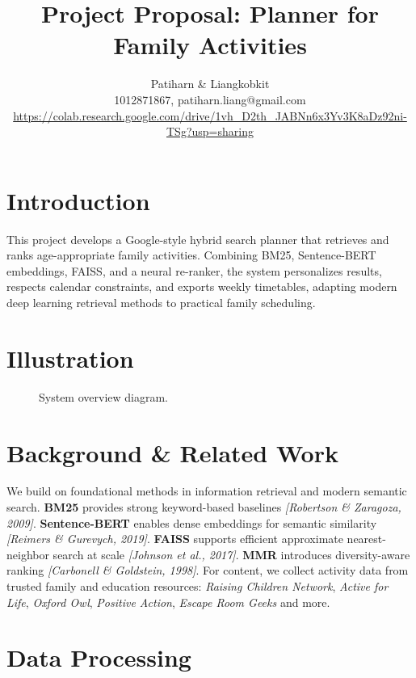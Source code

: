 \documentclass[final]{article}
\title{Project Proposal:  Planner for Family Activities}
\author{%
  Patiharn \& Liangkobkit \\
  1012871867, patiharn.liang@gmail.com \\
    \scriptsize{\url{https://colab.research.google.com/drive/1vh_D2th_JABNn6x3Yv3K8aDz92ni-TSg?usp=sharing}}
}
\begin{document}
\maketitle

\vspace{-0.5in}

\section*{Introduction}
This project develops a Google-style hybrid search planner that retrieves and ranks age-appropriate family activities. Combining BM25, Sentence-BERT embeddings, FAISS, and a neural re-ranker, the system personalizes results, respects calendar constraints, and exports weekly timetables, adapting modern deep learning retrieval methods to practical family scheduling.


\section*{Illustration}
\begin{figure}[h]
\centering
{}
\caption{System overview diagram.}
\end{figure}

\section*{Background \& Related Work}
We build on foundational methods in information retrieval and modern semantic search. \textbf{BM25} provides strong keyword-based baselines \emph{[Robertson \& Zaragoza, 2009]}. \textbf{Sentence-BERT} enables dense embeddings for semantic similarity \emph{[Reimers \& Gurevych, 2019]}. \textbf{FAISS} supports efficient approximate nearest-neighbor search at scale \emph{[Johnson et al., 2017]}. \textbf{MMR} introduces diversity-aware ranking \emph{[Carbonell \& Goldstein, 1998]}.  
For content, we collect activity data from trusted family and education resources: \emph{Raising Children Network}, \emph{Active for Life}, \emph{Oxford Owl}, \emph{Positive Action},  \emph{Escape Room Geeks} and more.

\section*{Data Processing}
\end{document}

